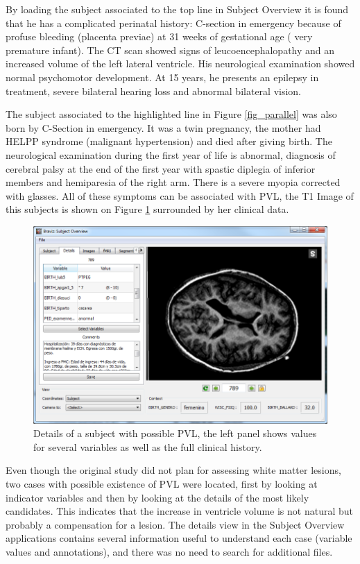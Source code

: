 \documentclass[twocolumn]{svjour3}
\begin{document}
By loading the subject associated to the top line in Subject Overview it is found that he has a complicated perinatal history: C-section in emergency because of profuse bleeding (placenta previae) at 31 weeks of gestational age ( very premature infant). The  CT scan showed signs of leucoencephalopathy  and an  increased volume of the left lateral ventricle. His neurological examination showed normal psychomotor development. At 15 years, he presents an epilepsy in  treatment, severe bilateral hearing loss and abnormal bilateral vision.  

The subject associated to the highlighted line in Figure \ref{fig_parallel} was also born by C-Section in emergency. It was a twin pregnancy, the mother had HELPP syndrome (malignant hypertension) and died after giving birth. The neurological examination during the first year of life is abnormal, diagnosis of cerebral palsy at the end of the first year with spastic diplegia of inferior members and hemiparesia of the right arm.  There is a severe myopia corrected with glasses. All of these symptoms can be associated with PVL, the T1 Image of this subjects is shown on Figure \ref{fig_subject3} surrounded by her clinical data.

\begin{figure}
\begin{center}
\includegraphics[width=\linewidth]{pvl_details}
\end{center}
 \caption{\label{fig_subject3}Details of a subject with possible PVL, the left panel shows values for several variables as well as the full clinical history.}
\end{figure}

Even though the original study did not plan for assessing white matter lesions, two cases with possible existence of PVL were located, first by looking at indicator variables and then by looking at the details of the most likely candidates. This indicates that the increase in ventricle volume is not natural but probably a compensation for a lesion. The details view in the Subject Overview applications contains several information useful to  understand each case (variable values and annotations), and there was no need to search for additional files. 
\end{document}

